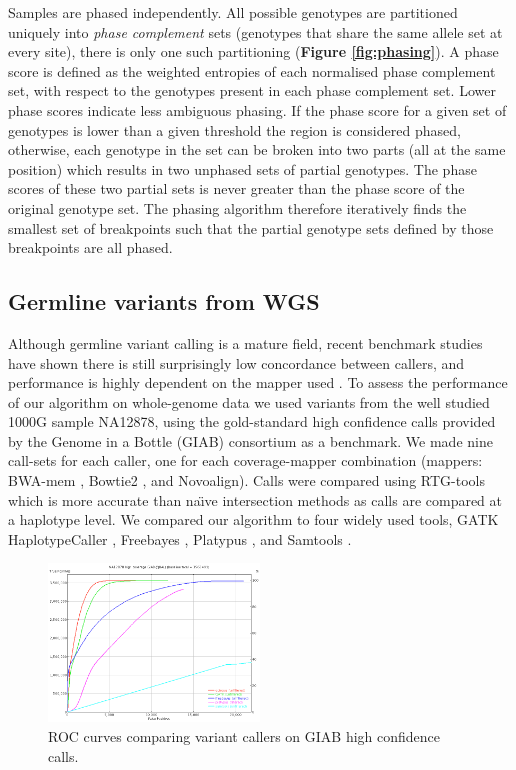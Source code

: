\documentclass[notitlepage, twocolumn]{article}
\begin{document}
Samples are phased independently. All possible genotypes are partitioned uniquely into  \emph{phase complement} sets (genotypes that share the same allele set at every site), there is only one such partitioning (\textbf{Figure \ref{fig:phasing}}). A phase score is defined as the weighted entropies of each normalised phase complement set, with respect to the genotypes present in each phase complement set. Lower phase scores indicate less ambiguous phasing. If the phase score for a given set of genotypes is lower than a given threshold the region is considered phased, otherwise, each genotype in the set can be broken into two parts (all at the same position) which results in two unphased sets of partial genotypes. The phase scores of these two partial sets is never greater than the phase score of the original genotype set. The phasing algorithm therefore iteratively finds the smallest set of breakpoints such that the partial genotype sets defined by those breakpoints are all phased.

\subsection*{Germline variants from WGS}

Although germline variant calling is a mature field, recent benchmark studies have shown there is still surprisingly low concordance between callers, and performance is highly dependent on the mapper used \cite{RN162, RN163}. To assess the performance of our algorithm on whole-genome data we used variants from the well studied 1000G sample NA12878, using the gold-standard high confidence calls provided by the Genome in a Bottle (GIAB) consortium \cite{RN153} as a benchmark. We made nine call-sets for each caller, one for each coverage-mapper combination (mappers: BWA-mem \cite{RN539}, Bowtie2 \cite{RN164}, and Novoalign). Calls were compared using RTG-tools \cite{RN169} which is more accurate than na\"\i ve intersection methods as calls are compared at a haplotype level. We compared our algorithm to four widely used tools, GATK HaplotypeCaller \cite{RN141}, Freebayes \cite{RN538}, Platypus \cite{RN5}, and Samtools \cite{RN537}. 

\begin{figure}[ht]
\centering
\includegraphics[width=0.5\textwidth]{figures/giab-benchmark}
\caption{ROC curves comparing variant callers on GIAB high confidence calls.}
\label{fig:giab}
\vspace{-1.5em}
\end{figure}
\end{document}
